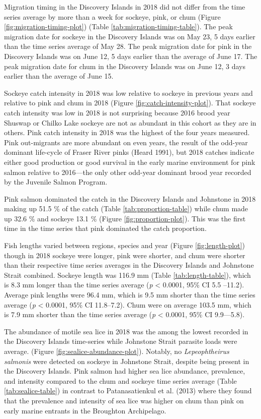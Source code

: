 \documentclass[fleqn,10pt]{wlpeerj} %
\begin{document}
Migration timing in the Discovery Islands in 2018 did not differ from
the time series average by more than a week for sockeye, pink, or chum
(Figure \ref{fig:migration-timing-plot}) (Table
\ref{tab:migration-timing-table}). The peak migration date for sockeye
in the Discovery Islands was on May 23, 5 days earlier than the time
series average of May 28. The peak migration date for pink in the
Discovery Islands was on June 12, 5 days earlier than the average of
June 17. The peak migration date for chum in the Discovery Islands was
on June 12, 3 days earlier than the average of June 15.

Sockeye catch intensity in 2018 was low relative to sockeye in previous
years and relative to pink and chum in 2018 (Figure
\ref{fig:catch-intensity-plot}). That sockeye catch intensity was low in
2018 is not surprising because 2016 brood year Shuswap or Chilko Lake
sockeye are not as abundant in this cohort as they are in others. Pink
catch intensity in 2018 was the highest of the four years measured. Pink
out-migrants are more abundant on even years, the result of the odd-year
dominant life-cycle of Fraser River pinks (Heard 1991), but 2018 catches
indicate either good production or good survival in the early marine
environment for pink salmon relative to 2016---the only other odd-year
dominant brood year recorded by the Juvenile Salmon Program.

Pink salmon dominated the catch in the Discovery Islands and Johnstone
in 2018 making up 51.5 \% of the catch (Table
\ref{tab:proportion-table}) while chum made up 32.6 \% and sockeye 13.1
\% (Figure \ref{fig:proportion-plot}). This was the first time in the
time series that pink dominated the catch proportion.

Fish lengths varied between regions, species and year (Figure
\ref{fig:length-plot}) though in 2018 sockeye were longer, pink were
shorter, and chum were shorter than their respective time series
averages in the Discovery Islands and Johnstone Strait combined. Sockeye
length was 116.9 mm (Table \ref{tab:length-table}), which is 8.3 mm
longer than the time series average (\emph{p} \textless{} 0.0001, 95\%
CI 5.5 --11.2). Average pink lengths were 96.4 mm, which is 9.5 mm
shorter than the time series average (\emph{p} \textless{} 0.0001, 95\%
CI 11.8--7.2). Chum were on average 103.5 mm, which is 7.9 mm shorter
than the time series average (\emph{p} \textless{} 0.0001, 95\% CI
9.9---5.8).

The abundance of motile sea lice in 2018 was the among the lowest
recorded in the Discovery Islands time-series while Johnstone Strait
parasite loads were average. (Figure \ref{fig:sealice-abundance-plot}).
Notably, no \emph{Lepeophtheirus salmonis} were detected on sockeye in
Johnstone Strait, despite being present in the Discovery Islands. Pink
salmon had higher sea lice abundance, prevalence, and intensity compared
to the chum and sockeye time series average (Table
\ref{tab:sealice-table}) in contrast to Patanasatienkul et al. (2013)
where they found that the prevalence and intensity of sea lice was
higher on chum than pink on early marine entrants in the Broughton
Archipelago.
\end{document}
